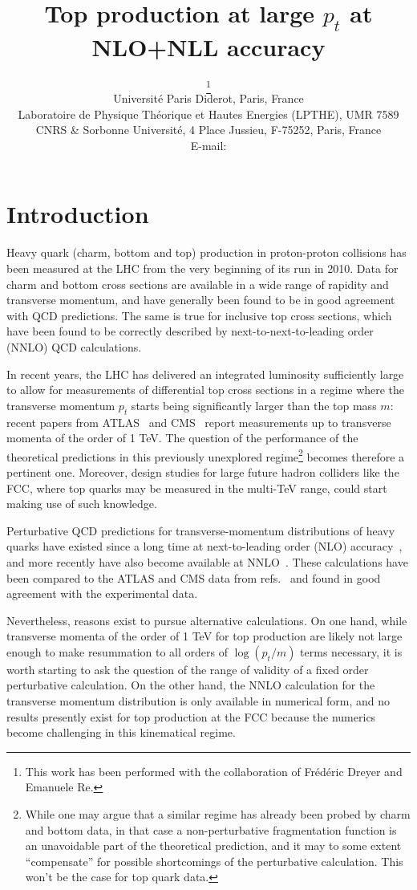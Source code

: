 \documentclass{PoS}
\title{Top production at large $p_t$ at NLO+NLL accuracy}
\author{\speaker{Matteo Cacciari}\thanks{This work has been performed with the
collaboration of Fr\'ed\'eric Dreyer and Emanuele Re.}\\
        Universit\'e Paris Diderot, Paris, France\\
	Laboratoire de Physique Th\'eorique et Hautes Energies (LPTHE), UMR 7589
	CNRS \& Sorbonne Universit\'e, 4 Place Jussieu, F-75252, Paris, France \\
        E-mail: \email{cacciari@lpthe.jussieu.fr}}
\begin{document}
\section{Introduction}

Heavy quark (charm, bottom and top) production in proton-proton collisions has
been measured at the LHC from the very beginning of its run in 2010. Data for
charm and bottom cross sections are available in a wide range of rapidity and
transverse momentum, and have generally been found to be in good agreement with
QCD predictions. The same is true for inclusive top cross sections, which have
been found to be correctly described by next-to-next-to-leading order (NNLO) QCD
calculations.

In recent years, the LHC has delivered an integrated luminosity sufficiently
large to allow for measurements of differential top cross sections in a regime where the
transverse momentum $p_t$ starts being significantly larger than the top mass
$m$: recent papers from ATLAS~\cite{Aaboud:2018eqg} and CMS~\cite{Sirunyan:2018wem} report measurements up to
transverse momenta of the order of 1 TeV. The question of the
performance of the theoretical predictions in this previously unexplored
regime\footnote{While one may argue that a similar regime has already been probed by
charm and bottom data, in that case a non-perturbative fragmentation function is an
unavoidable part of the theoretical prediction, and it may to some extent ``compensate''
for possible shortcomings of the perturbative calculation. This won't be the case for top
quark data.}
becomes therefore a pertinent one. Moreover, design studies for large future hadron
colliders like the FCC, where top quarks may be measured in the
multi-TeV range, could start making use of such knowledge.

Perturbative QCD predictions for transverse-momentum distributions of heavy
quarks have existed since a long time at next-to-leading order (NLO) accuracy~\cite{Nason:1989zy,Beenakker:1988bq}, and more
recently have also become available at NNLO~\cite{Czakon:2015owf,Czakon:2016ckf,Czakon:2016dgf}. These calculations
have been compared to the ATLAS and CMS data from refs.~\cite{Aaboud:2018eqg,Sirunyan:2018wem} and found in good
agreement with the experimental data.

Nevertheless, reasons exist to pursue alternative calculations. On one hand,
while transverse momenta of the order of 1 TeV for top production  are likely
not large enough to make resummation to all orders of $\log(p_t/m)$ terms 
necessary, it is worth starting to ask the question of the range of validity of
a fixed order perturbative calculation. On the other hand, the NNLO calculation
for the transverse momentum distribution is only available in numerical form,
and no results presently exist for top production at the FCC because the
numerics become challenging in this kinematical regime.
\end{document}
